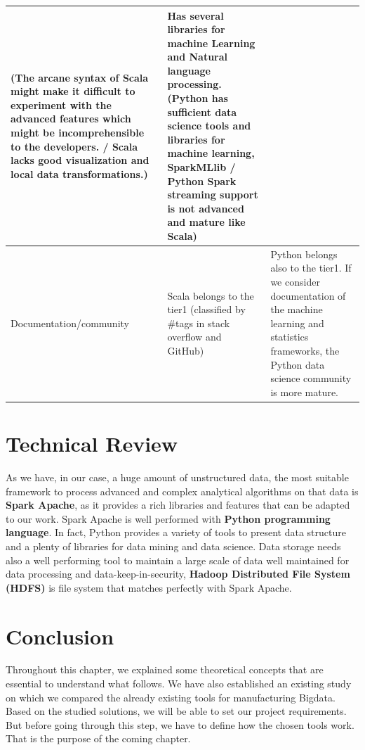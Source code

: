\begin{table}[H]
\begin{center}
\begin{tabularx}{17cm}{ |p{2.8cm}|X|X| }
(The arcane syntax of Scala might make it difficult to experiment with the advanced features which might be incomprehensible to the developers. / Scala lacks good visualization and local data transformations.) & Has several libraries for machine Learning and Natural language processing.
(Python has sufficient data science tools and libraries for machine learning, SparkMLlib / Python Spark streaming support is not advanced and mature like Scala)\\ \hline
  Documentation/\newline community &Scala belongs to the tier1 (classified by \#tags in stack overflow and GitHub) & Python belongs also to the tier1. If we consider documentation of the machine learning and statistics frameworks, the Python data science community is more mature.\\ \hline
\end{tabularx}
\end{center}
\label{cmp}
\end{table}
\newpage
\section{Technical Review}
As we have, in our case, a huge amount of unstructured data, the most suitable framework to process advanced and complex analytical algorithms on that data is \textbf{Spark Apache}, as it provides a rich libraries and features that can be adapted to our work. Spark Apache is well performed with \textbf{Python programming language}. In fact, Python provides a variety of tools to present data structure and a plenty of libraries for data mining and data science. Data storage needs also a well performing tool to maintain a large scale of data well maintained for data processing and data-keep-in-security, \textbf{Hadoop Distributed File System (HDFS)} is file system that matches perfectly with Spark Apache. 
 

\section*{Conclusion} 

Throughout this chapter, we explained some theoretical concepts that are essential to understand what follows. We have also established an existing study on which we compared the already existing tools for manufacturing Bigdata. Based on the studied solutions, we will be able to set our project requirements. But before going through this step, we have to define how the chosen tools work. That is the purpose of the coming chapter.